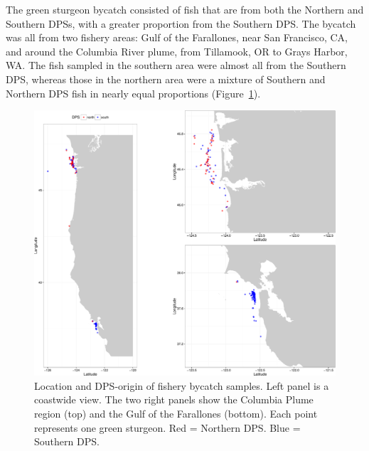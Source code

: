 The green sturgeon bycatch consisted of fish that are from both the Northern and
Southern DPSs, with a greater proportion from the Southern DPS. The bycatch was
all from two fishery areas: Gulf of the Farallones, near San Francisco, CA, and around the Columbia River
plume, from Tillamook, OR to Grays Harbor, WA. The fish sampled in the southern
area were almost all from the Southern DPS, whereas those in the northern area
were a mixture of Southern and Northern DPS fish in nearly equal proportions
(Figure~\ref{fig:bycatch-map}).
\begin{figure}
\begin{center}
\includegraphics[width = \textwidth]{inputs/bycatch_map-crop.pdf}
\end{center}
\caption{ Location and DPS-origin of fishery bycatch samples. Left panel is a coastwide
view.  The two right panels show the Columbia Plume region (top) and the 
Gulf of the Farallones (bottom).  Each point represents one green sturgeon.  Red = Northern DPS. 
Blue = Southern DPS. }
\label{fig:bycatch-map}
\end{figure}




